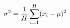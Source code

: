 \documentclass[preview]{standalone}
\begin{document}
\begin{align*}
\special{dvisvgm:raw <g id='unique000'>}\sigma^2 = \frac{1}{H} \sum_{i=1}^{H} (x_i - \mu)^2\special{dvisvgm:raw </g>}
\end{align*}
\end{document}
